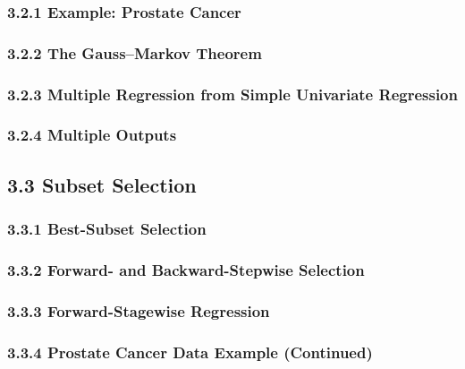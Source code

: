 \documentclass[11pt]{article}
\begin{document}
\subsubsection{3.2.1 Example: Prostate
Cancer}\label{example-prostate-cancer}

\subsubsection{3.2.2 The Gauss--Markov
Theorem}\label{the-gaussmarkov-theorem}

\subsubsection{3.2.3 Multiple Regression from Simple Univariate
Regression}\label{multiple-regression-from-simple-univariate-regression}

\subsubsection{3.2.4 Multiple Outputs}\label{multiple-outputs}

\subsection{3.3 Subset Selection}\label{subset-selection}

\subsubsection{3.3.1 Best-Subset Selection}\label{best-subset-selection}

\subsubsection{3.3.2 Forward- and Backward-Stepwise
Selection}\label{forward--and-backward-stepwise-selection}

\subsubsection{3.3.3 Forward-Stagewise
Regression}\label{forward-stagewise-regression}

\subsubsection{3.3.4 Prostate Cancer Data Example
(Continued)}\label{prostate-cancer-data-example-continued}
\end{document}
